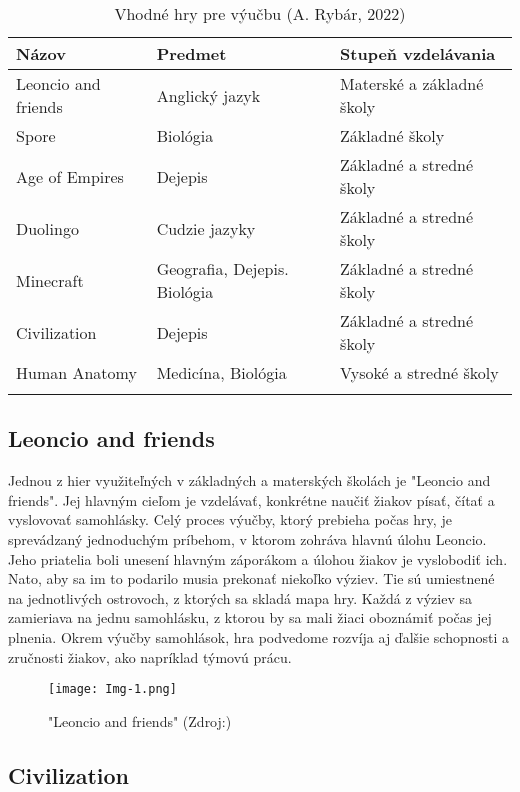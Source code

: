 \documentclass[10pt,twoside,slovak,a4paper]{article}
\begin{document}
\begin{table}[tbh]
	\centering
	\caption{Vhodné hry pre výučbu (A. Rybár, 2022)}
	\begin{tabular}{p{1.2in} p{1.7in} p{1.6in}}
		Názov & Predmet & Stupeň vzdelávania\\ \hline
		Leoncio and friends & Anglický jazyk & Materské a základné školy\\
		Spore & Biológia & Základné školy\\
		Age of Empires & Dejepis & Základné a stredné školy\\
		Duolingo & Cudzie jazyky & Základné a stredné školy\\
		Minecraft & Geografia, Dejepis. Biológia & Základné a stredné školy\\
		Civilization & Dejepis & Základné a stredné školy\\
		Human Anatomy & Medicína, Biológia & Vysoké a stredné školy\\
	\label{tab:vyuzit-hry}
	\end{tabular}
\end{table}

\subsection{Leoncio and friends} \label{hra-1}

Jednou z hier využiteľných v základných a materských školách je "Leoncio and friends"\cite{Zea2009-eh}. Jej hlavným cieľom je vzdelávať, konkrétne naučiť žiakov písať, čítať a vyslovovať samohlásky. Celý proces výučby, ktorý prebieha počas hry, je sprevádzaný jednoduchým príbehom, v ktorom zohráva hlavnú úlohu Leoncio. Jeho priatelia boli unesení hlavným záporákom a úlohou žiakov je vyslobodiť ich. Nato, aby sa im to podarilo musia prekonať niekoľko výziev. Tie sú umiestnené na jednotlivých ostrovoch, z ktorých sa skladá mapa hry. Každá z výziev sa zamieriava na jednu samohlásku, z ktorou by sa mali žiaci oboznámiť počas jej plnenia. Okrem výučby samohlások, hra podvedome rozvíja aj ďalšie schopnosti a zručnosti žiakov, ako napríklad týmovú prácu.

\begin{figure}[tbh]
	\centering
	\texttt{[image: Img-1.png]}
	\caption{"Leoncio and friends" (Zdroj:\cite{Zea2009-eh})}
	\label{obr-1}
\end{figure}

\subsection{Civilization} \label{hra-2}
\end{document}
